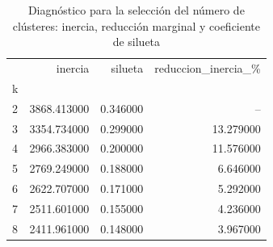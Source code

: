 \begin{table}
\caption{Diagnóstico para la selección del número de clústeres: inercia, reducción marginal y coeficiente de silueta}
\label{tab:seleccion_k}
\begin{tabular}{lrrr}
\toprule
 & inercia & silueta & reduccion\_inercia\_\% \\
k &  &  &  \\
\midrule
2 & 3868.413000 & 0.346000 & -- \\
3 & 3354.734000 & 0.299000 & 13.279000 \\
4 & 2966.383000 & 0.200000 & 11.576000 \\
5 & 2769.249000 & 0.188000 & 6.646000 \\
6 & 2622.707000 & 0.171000 & 5.292000 \\
7 & 2511.601000 & 0.155000 & 4.236000 \\
8 & 2411.961000 & 0.148000 & 3.967000 \\
\bottomrule
\end{tabular}
\end{table}
